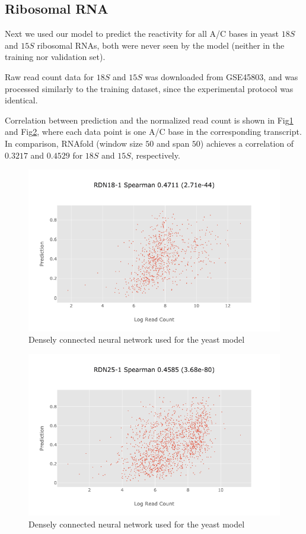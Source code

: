 \documentclass{proposal}
\begin{document}
\subsection{Ribosomal RNA}

Next we used our model to predict the reactivity for all A/C bases in yeast $18S$ and $15S$ ribosomal RNAs,
both were never seen by the model (neither in the training nor validation set).

Raw read count data for $18S$ and $15S$ was downloaded from GSE45803, and was processed similarly to the training dataset,
since the experimental protocol was identical.

Correlation between prediction and the normalized read count is shown in Fig\ref{fig:yeast_r18_performance} and Fig\ref{fig:yeast_r25_performance},
where each data point is one A/C base in the corresponding transcript.
In comparison, RNAfold (window size $50$ and span $50$) achieves a correlation of $0.3217$ and $0.4529$ for $18S$ and $15S$, respectively.

\begin{figure}[h!]
\includegraphics[width=\textwidth]{yeast_r18_performance.png}
\caption{Densely connected neural network used for the yeast model}
\label{fig:yeast_r18_performance}
\centering
\end{figure}

\begin{figure}[h!]
\includegraphics[width=\textwidth]{yeast_r25_performance.png}
\caption{Densely connected neural network used for the yeast model}
\label{fig:yeast_r25_performance}
\centering
\end{figure}
\end{document}
